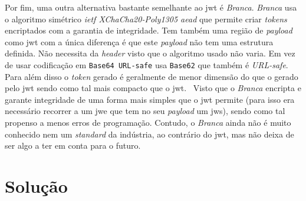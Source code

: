 Por fim, uma outra alternativa bastante semelhante ao \acrshort{jwt} é \textit{Branca}. 
\textit{Branca} usa o algoritmo simétrico \textit{\acrshort{ietf} XChaCha20-Poly1305 \acrshort{aead}} que permite 
criar \textit{tokens} encriptados com a garantia de integridade. Tem também uma região de \textit{payload} como 
\acrshort{jwt} com a única diferença é que este \textit{payload} não tem uma estrutura definida. Não necessita da 
\textit{header} visto que o algoritmo usado não varia. Em vez de usar codificação em \texttt{Base64 URL-safe} 
usa \texttt{Base62} que também é \textit{URL-safe}. Para além disso o \textit{token} gerado é geralmente de menor 
dimensão do que o gerado pelo \acrshort{jwt} sendo como tal mais compacto que o \acrshort{jwt}.~\cite{branca} 
Visto que o \textit{Branca} encripta e garante integridade de uma forma mais simples que o \acrshort{jwt} 
permite (para isso era necessário recorrer a um \acrshort{jwe} que tem no seu \textit{payload} um \acrshort{jws}), 
sendo como tal propenso a menos erros de programação. 
Contudo, o \textit{Branca} ainda não é muito conhecido nem um \textit{standard} da indústria, ao contrário do 
\acrshort{jwt}, mas não deixa de ser algo a ter em conta para o futuro. 

\section{Solução}

